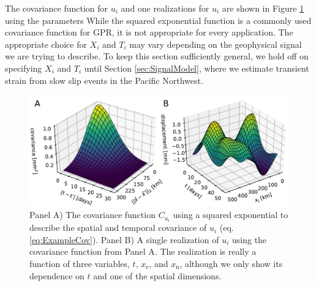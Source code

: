 \documentclass[extra,mreferee]{gji}
\begin{document}
The covariance function for $u_i$ and one realizations
for $u_i$ are shown in Figure \ref{fig:PriorDemo} using the parameters
While the
squared exponential function is a commonly used covariance function
for GPR, it is not appropriate for every application. The appropriate
choice for $X_i$ and $T_i$ may vary depending on the geophysical
signal we are trying to describe. To keep this section sufficiently
general, we hold off on specifying $X_i$ and $T_i$ until Section
\ref{sec:SignalModel}, where we estimate transient strain from slow
slip events in the Pacific Northwest.

\begin{figure}
\includegraphics{figures/prior_demo/prior-demo.pdf}
\caption{ 
Panel A) The covariance function $C_{u_i}$ using a squared exponential
to describe the spatial and temporal covariance of $u_i$ (eq.
\ref{eq:ExampleCov}). Panel B) A single realization of $u_i$ using the
covariance function from Panel A. The realization is really a function
of three variables, $t$, $x_\mathrm{e}$, and $x_\mathrm{n}$, although
we only show its dependence on $t$ and one of the spatial dimensions.
}    
\label{fig:PriorDemo}
\end{figure}
\end{document}
